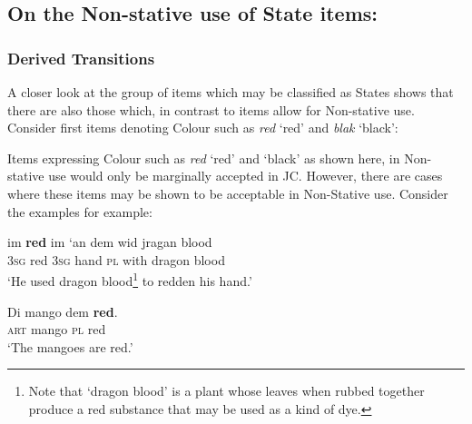 \subsection{On the Non-stative use of State items:}\label{sec:5.2.3}
\subsubsection{Derived Transitions}\label{sec:5.2.3.1}

A closer look at the group of items which may be classified as States shows that there are also those which, in contrast to items  allow for Non-stative use. Consider first items denoting Colour such as \textit{red} `red' and \textit{blak} `black': 

\ea%
 \label{ex:5:20} 


\z
\z

 Items expressing Colour such as \textit{red} `red' and `black' as shown here, in Non-stative use would only be marginally accepted in JC. However, there are cases where these items may be shown to be acceptable in Non-Stative use. Consider the examples  for example:


\ea%
 \label{ex:5:21}
\gll im \textbf{red} im ‘an dem wid jragan blood\\
\textsc{3sg} red \textsc{3sg} hand {\textsc{pl}} with dragon blood\\
\glt ‘He used dragon blood\footnote{Note that `dragon blood' is a plant whose leaves when rubbed together produce a red substance that may be used as a kind of dye.} to redden his hand.'
 \z

\ea%
 \label{ex:5:22}
\ea 
\gll Di mango dem \textbf{red}.\\
\textsc{art} mango {\textsc{pl}} red\\
\glt {} `The mangoes are red.'

